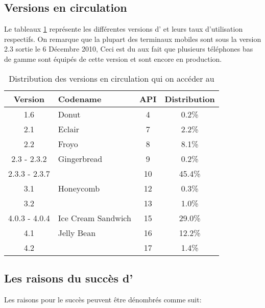 
\subsection{Versions \android{} en circulation}

Le tableaux \ref{tab:androidversion} représente les différentes versions
d'\android{} et leurs taux d'utilisation respectifs. On remarque que
la plupart des terminaux mobiles \android{} sont sous la version 2.3
 sortie le 6 Décembre 2010, Ceci est du aux fait que
plusieurs téléphones bas de gamme sont équipés de cette version et sont encore en production.

\begin{table}[H]
\centering
\begin{tabular}{|c|l|c|c|}
\hline
\textsf{Version} & \textsf{Codename} & \textsf{API} &
\textsf{Distribution}\\
\hline
1.6 & Donut & 4 & 0.2\%\\
\hline
2.1 & Eclair & 7 & 2.2\%\\
\hline
2.2 & Froyo & 8 & 8.1\%\\
\hline
2.3 - 2.3.2 & Gingerbread & 9 & 0.2\% \\
\cline{1-1}\cline{3-4}
2.3.3 - 2.3.7 & & 10 & 45.4\%\\
\hline
3.1 & Honeycomb & 12 & 0.3\%\\
\cline{1-1}\cline{3-4}
3.2 & & 13 & 1.0\%\\
\hline
4.0.3 - 4.0.4 & Ice Cream Sandwich & 15 & 29.0\%\\
\hline
4.1 & Jelly Bean & 16 & 12.2\%\\
\cline{1-1}\cline{3-4}
4.2 & & 17 & 1.4\%\\
\hline
\end{tabular}
\caption{Distribution des versions \android{} en circulation qui on
accéder au \protect\footnotemark[5]}
\label{tab:androidversion}
\end{table}


\subsection[Les raisons du succès d'\android{}]{Les raisons du succès d'\android{}\cite{lft:growth_android}}

Les raisons pour le succès \android{} peuvent être
dénombrés comme suit:

